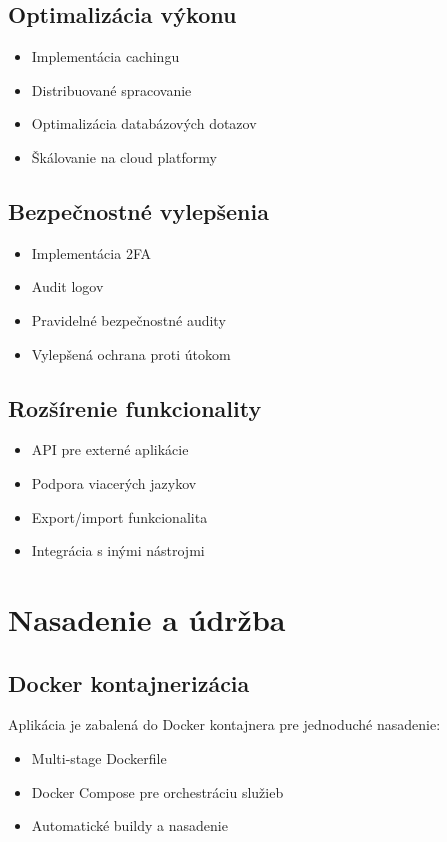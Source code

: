 \documentclass[12pt,a4paper]{article}
\begin{document}
\subsection{Optimalizácia výkonu}
\begin{itemize}
    \item Implementácia cachingu
    \item Distribuované spracovanie
    \item Optimalizácia databázových dotazov
    \item Škálovanie na cloud platformy
\end{itemize}

\subsection{Bezpečnostné vylepšenia}
\begin{itemize}
    \item Implementácia 2FA
    \item Audit logov
    \item Pravidelné bezpečnostné audity
    \item Vylepšená ochrana proti útokom
\end{itemize}

\subsection{Rozšírenie funkcionality}
\begin{itemize}
    \item API pre externé aplikácie
    \item Podpora viacerých jazykov
    \item Export/import funkcionalita
    \item Integrácia s inými nástrojmi
\end{itemize}

\section{Nasadenie a údržba}
\subsection{Docker kontajnerizácia}
Aplikácia je zabalená do Docker kontajnera pre jednoduché nasadenie:
\begin{itemize}
    \item Multi-stage Dockerfile
    \item Docker Compose pre orchestráciu služieb
    \item Automatické buildy a nasadenie
\end{itemize}
\end{document}
